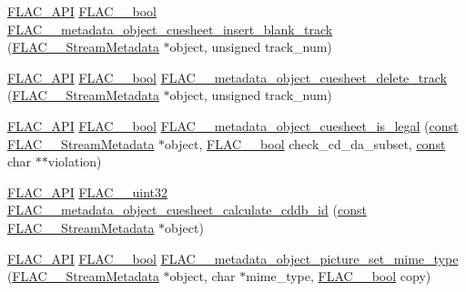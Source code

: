 \begin{DoxyCompactItemize}
\item 
\hyperlink{group__flac__export_ga56ca07df8a23310707732b1c0007d6f5}{F\+L\+A\+C\+\_\+\+A\+PI} \hyperlink{ordinals_8h_a95103469f1cbd78b8cf250194985b34e}{F\+L\+A\+C\+\_\+\+\_\+bool} \hyperlink{group__flac__metadata__object_ga87855591d933cd6371010a675f0bc629}{F\+L\+A\+C\+\_\+\+\_\+metadata\+\_\+object\+\_\+cuesheet\+\_\+insert\+\_\+blank\+\_\+track} (\hyperlink{struct_f_l_a_c_____stream_metadata}{F\+L\+A\+C\+\_\+\+\_\+\+Stream\+Metadata} $\ast$object, unsigned track\+\_\+num)
\item 
\hyperlink{group__flac__export_ga56ca07df8a23310707732b1c0007d6f5}{F\+L\+A\+C\+\_\+\+A\+PI} \hyperlink{ordinals_8h_a95103469f1cbd78b8cf250194985b34e}{F\+L\+A\+C\+\_\+\+\_\+bool} \hyperlink{group__flac__metadata__object_ga3232bae96f19722bee19afd37fdc214d}{F\+L\+A\+C\+\_\+\+\_\+metadata\+\_\+object\+\_\+cuesheet\+\_\+delete\+\_\+track} (\hyperlink{struct_f_l_a_c_____stream_metadata}{F\+L\+A\+C\+\_\+\+\_\+\+Stream\+Metadata} $\ast$object, unsigned track\+\_\+num)
\item 
\hyperlink{group__flac__export_ga56ca07df8a23310707732b1c0007d6f5}{F\+L\+A\+C\+\_\+\+A\+PI} \hyperlink{ordinals_8h_a95103469f1cbd78b8cf250194985b34e}{F\+L\+A\+C\+\_\+\+\_\+bool} \hyperlink{group__flac__metadata__object_ga1160f85e437c1a763ec0a8f372cb1390}{F\+L\+A\+C\+\_\+\+\_\+metadata\+\_\+object\+\_\+cuesheet\+\_\+is\+\_\+legal} (\hyperlink{getopt1_8c_a2c212835823e3c54a8ab6d95c652660e}{const} \hyperlink{struct_f_l_a_c_____stream_metadata}{F\+L\+A\+C\+\_\+\+\_\+\+Stream\+Metadata} $\ast$object, \hyperlink{ordinals_8h_a95103469f1cbd78b8cf250194985b34e}{F\+L\+A\+C\+\_\+\+\_\+bool} check\+\_\+cd\+\_\+da\+\_\+subset, \hyperlink{getopt1_8c_a2c212835823e3c54a8ab6d95c652660e}{const} char $\ast$$\ast$violation)
\item 
\hyperlink{group__flac__export_ga56ca07df8a23310707732b1c0007d6f5}{F\+L\+A\+C\+\_\+\+A\+PI} \hyperlink{ordinals_8h_a9c4005ea7ef8d564b0cc993cdd0e4e5e}{F\+L\+A\+C\+\_\+\+\_\+uint32} \hyperlink{group__flac__metadata__object_ga897138ca0a985d8741f73d6657f38845}{F\+L\+A\+C\+\_\+\+\_\+metadata\+\_\+object\+\_\+cuesheet\+\_\+calculate\+\_\+cddb\+\_\+id} (\hyperlink{getopt1_8c_a2c212835823e3c54a8ab6d95c652660e}{const} \hyperlink{struct_f_l_a_c_____stream_metadata}{F\+L\+A\+C\+\_\+\+\_\+\+Stream\+Metadata} $\ast$object)
\item 
\hyperlink{group__flac__export_ga56ca07df8a23310707732b1c0007d6f5}{F\+L\+A\+C\+\_\+\+A\+PI} \hyperlink{ordinals_8h_a95103469f1cbd78b8cf250194985b34e}{F\+L\+A\+C\+\_\+\+\_\+bool} \hyperlink{group__flac__metadata__object_ga5db3363648b6e7693e032f200f241e85}{F\+L\+A\+C\+\_\+\+\_\+metadata\+\_\+object\+\_\+picture\+\_\+set\+\_\+mime\+\_\+type} (\hyperlink{struct_f_l_a_c_____stream_metadata}{F\+L\+A\+C\+\_\+\+\_\+\+Stream\+Metadata} $\ast$object, char $\ast$mime\+\_\+type, \hyperlink{ordinals_8h_a95103469f1cbd78b8cf250194985b34e}{F\+L\+A\+C\+\_\+\+\_\+bool} copy)
$$
\end{DoxyCompactItemize}
